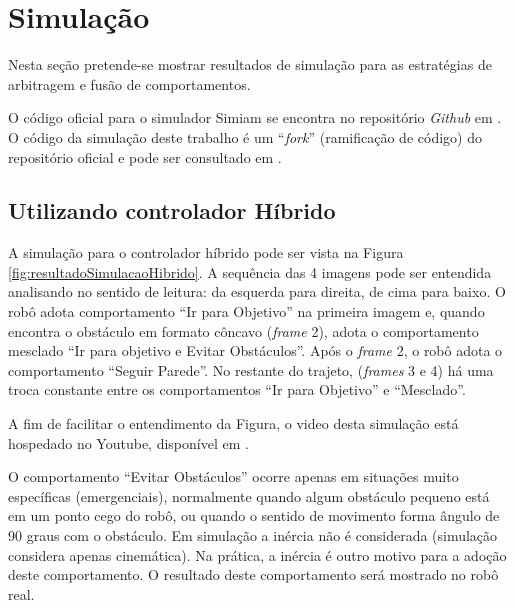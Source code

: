 	
	
	
	
\section{Simulação}

	Nesta seção pretende-se mostrar resultados de simulação para as estratégias de 
	arbitragem e fusão de comportamentos. 
	
	O código oficial para o simulador Simiam se encontra no repositório \textit{Github}
	em . O código da simulação deste trabalho 
	é um ``\textit{fork}'' (ramificação de código) do repositório oficial e pode ser 
	consultado em .
	
	\subsection{Utilizando controlador Híbrido}
	
	A simulação para o controlador híbrido pode ser vista na Figura 
	\ref{fig:resultadoSimulacaoHibrido}. A sequência das 4 imagens pode ser entendida 
	analisando no sentido de leitura: da esquerda para direita, de cima para baixo. O 
	robô adota comportamento ``Ir para Objetivo'' na primeira imagem e, quando encontra 
	o obstáculo em formato côncavo (\textit{frame} 2), adota o comportamento mesclado 
	``Ir para objetivo e Evitar Obstáculos''. Após o \textit{frame} 2, o robô adota o 
	comportamento ``Seguir Parede''. No restante do trajeto, (\textit{frames} 3 e 4) há 
	uma troca constante entre os comportamentos ``Ir para Objetivo'' e ``Mesclado''.
	
	
	
	A fim de facilitar o entendimento da Figura, o video desta simulação está hospedado
	no Youtube, disponível em .
	
	O comportamento ``Evitar Obstáculos'' ocorre apenas em situações muito específicas
	(emergenciais), normalmente quando algum obstáculo pequeno está em um ponto cego do 
	robô, ou quando o sentido de movimento forma ângulo de 90 graus com o obstáculo. Em 
	simulação a inércia não é considerada (simulação considera apenas cinemática). Na 
	prática, a inércia é outro motivo para a adoção deste comportamento. O resultado 
	deste comportamento será mostrado no robô real.
	
